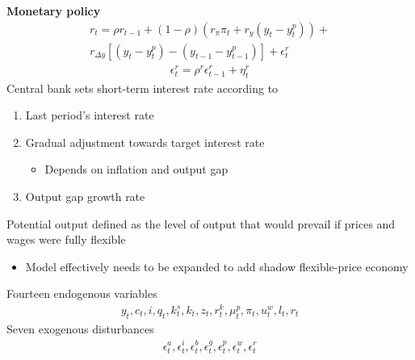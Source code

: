 \documentclass{beamer}
\begin{document}
\begin{frame}
  \textbf{Monetary policy}
\begin{align}
  r_t = \rho r_{t-1} + (1-\rho)(r_\pi \pi_t + r_y(y_t - y_t^p)) + \\ \nonumber r_{\Delta y} [(y_t - y_t^p) - (y_{t-1} - y_{t-1}^p)] + \epsilon_t^r 
\end{align}
\begin{align}  \epsilon_t^r = \rho^r \epsilon^r_{t-1} + \eta_t^r \end{align}
\medskip
Central bank sets short-term interest rate according to
\begin{enumerate}
  \item Last period's interest rate
  \item Gradual adjustment towards target interest rate
  \begin{itemize}
    \item Depends on inflation and output gap
  \end{itemize}
  \item Output gap growth rate
\end{enumerate}
\medskip
Potential output defined as the level of output that would prevail if prices and wages were fully flexible
\begin{itemize}
  \item  Model effectively needs to be expanded to add shadow flexible-price economy
\end{itemize}
\end{frame}

\begin{frame}
  Fourteen endogenous variables
  \begin{align*}
    y_t,c_t,i,q_t,k_t^s,k_t,z_t,r_t^k,\mu_t^p,\pi_t,u_t^w,l_t,r_t
  \end{align*}
  \medskip
  Seven exogenous disturbances
  \begin{align*}
    \epsilon_t^a,\epsilon_t^i,\epsilon_t^b,\epsilon_t^g,\epsilon_t^p,\epsilon_t^w,\epsilon_t^r
  \end{align*}  
\end{frame}
\end{document}
